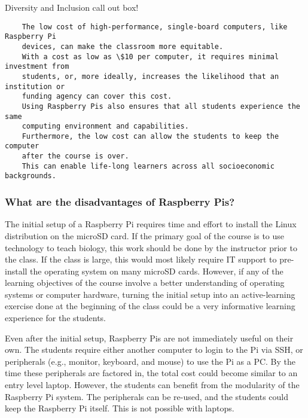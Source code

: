 {\begin{framed}
Diversity and Inclusion call out box! 
\begin{snugshade*}
\begin{lstlisting}
    The low cost of high-performance, single-board computers, like Raspberry Pi
    devices, can make the classroom more equitable.
    With a cost as low as \$10 per computer, it requires minimal investment from
    students, or, more ideally, increases the likelihood that an institution or
    funding agency can cover this cost.
    Using Raspberry Pis also ensures that all students experience the same
    computing environment and capabilities.
    Furthermore, the low cost can allow the students to keep the computer
    after the course is over.
    This can enable life-long learners across all socioeconomic backgrounds.
\end{lstlisting}
\end{snugshade*}
\end{framed}}

\subsubsection{What are the disadvantages of Raspberry Pis?}

The initial setup of a Raspberry Pi requires time and effort to install the
Linux distribution on the microSD card.
If the primary goal of the course is to use technology to teach biology,
this work should be done by the instructor prior to the class.
If the class is large, this would most likely require IT support to pre-install
the operating system on many microSD cards.
However, if any of the learning objectives of the course involve
a better understanding of operating systems or computer hardware,
turning the initial setup into an active-learning exercise done
at the beginning of the class could be a very informative
learning experience for the students.

Even after the initial setup, Raspberry Pis are not immediately useful on their
own.
The students require either another computer to login to the Pi via SSH, or
peripherals (e.g., monitor, keyboard, and mouse) to use the Pi as a PC.
By the time these peripherals are factored in, the total cost could become
similar to an entry level laptop.
However, the students can benefit from the modularity of the Raspberry Pi
system.
The peripherals can be re-used, and the students could keep the Raspberry Pi
itself.
This is not possible with laptops.

